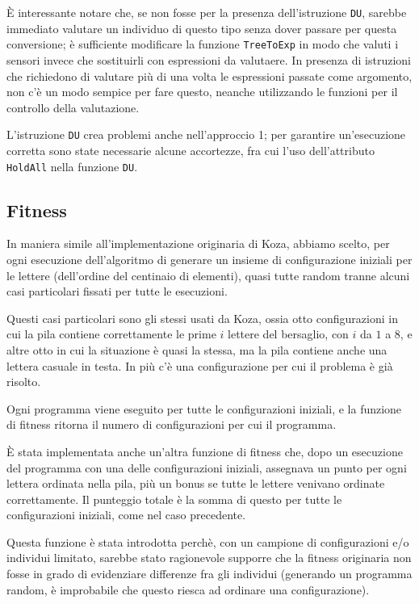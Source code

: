 \documentclass[paper=a4, fontsize=11pt]{scrartcl}
\numberwithin{equation}{section}		%
\numberwithin{figure}{section}			%
\numberwithin{table}{section}				%
\begin{document}
È interessante notare che, se non fosse per la presenza dell'istruzione \texttt{DU}, sarebbe immediato valutare un individuo di questo tipo senza dover passare per questa conversione; è sufficiente modificare la funzione \texttt{TreeToExp} in modo che valuti i sensori invece che sostituirli con espressioni da valutaere. In presenza di istruzioni che richiedono di valutare più di una volta le espressioni passate come argomento, non c'è un modo sempice per fare questo, neanche utilizzando le funzioni per il controllo della valutazione.

L'istruzione \texttt{DU} crea problemi anche nell'approccio 1; per garantire un'esecuzione corretta sono state necessarie alcune accortezze, fra cui l'uso dell'attributo \texttt{HoldAll} nella funzione \texttt{DU}.


\subsection{Fitness}
In maniera simile all'implementazione originaria di Koza, abbiamo scelto, per ogni esecuzione dell'algoritmo di generare un insieme di configurazione iniziali per le lettere (dell'ordine del centinaio di elementi), quasi tutte random tranne alcuni casi particolari fissati per tutte le esecuzioni.

Questi casi particolari sono gli stessi usati da Koza, ossia otto configurazioni in cui la pila contiene correttamente le prime $i$ lettere del bersaglio, con $i$ da $1$ a $8$, e altre otto in cui la situazione è quasi la stessa, ma la pila contiene anche una lettera casuale in testa. In più c'è una configurazione per cui il problema è già risolto.


Ogni programma viene eseguito per tutte le configurazioni iniziali, e la funzione di fitness ritorna il numero di configurazioni per cui il programma.

È stata implementata anche un'altra funzione di fitness che, dopo un esecuzione del programma con una delle configurazioni iniziali, assegnava un punto per ogni lettera ordinata nella pila, più un bonus se tutte le lettere venivano ordinate correttamente. Il punteggio totale è la somma di questo per tutte le configurazioni iniziali, come nel caso precedente.
 
Questa funzione è stata introdotta perchè, con un campione di configurazioni e/o individui limitato, sarebbe stato ragionevole supporre che la fitness originaria non fosse in grado di evidenziare differenze fra gli individui (generando un programma random, è improbabile che questo riesca ad ordinare una configurazione).
\end{document}
